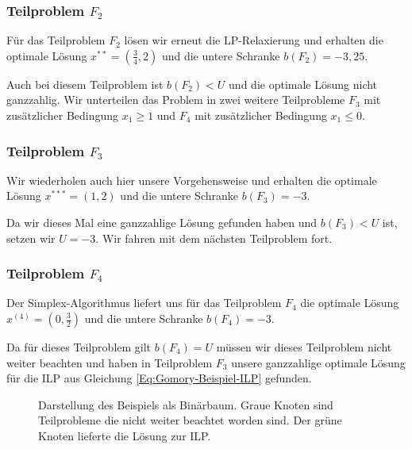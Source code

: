 \documentclass[tog]{acmsiggraph}
\begin{document}
\subsubsection*{Teilproblem $F_2$}

Für das Teilproblem $F_2$ lösen wir erneut die LP-Relaxierung und erhalten die optimale Lösung $x^{**} = (\frac{3}{4}, 2)$ und die untere Schranke $b(F_2) = -3,25$.

Auch bei diesem Teilproblem ist $b(F_2) < U$ und die optimale Lösung nicht ganzzahlig. Wir unterteilen das Problem in zwei weitere Teilprobleme $F_3$ mit zusätzlicher Bedingung $x_1 \geq 1$ und $F_4$ mit zusätzlicher Bedingung $x_1 \leq 0$.

\subsubsection*{Teilproblem $F_3$}

Wir wiederholen auch hier unsere Vorgehensweise und erhalten die optimale Lösung $x^{***} = (1, 2)$ und die untere Schranke $b(F_3) = -3$.

Da wir dieses Mal eine ganzzahlige Lösung gefunden haben und $b(F_3) < U$ ist, setzen wir $U = -3$. Wir fahren mit dem nächsten Teilproblem fort.

\subsubsection*{Teilproblem $F_4$}

Der Simplex-Algorithmus liefert uns für das Teilproblem $F_4$ die optimale Lösung $x^{(4)} = (0, \frac{3}{2})$ und die untere Schranke $b(F_4) = -3$.

Da für dieses Teilproblem gilt $b(F_4) = U$ müssen wir dieses Teilproblem nicht weiter beachten und haben in Teilproblem $F_3$ unsere ganzzahlige optimale Lösung für die ILP aus Gleichung \ref{Eq:Gomory-Beispiel-ILP} gefunden.

\begin{figure}[ht]
\centering
{}
\caption{Darstellung des Beispiels als Binärbaum. Graue Knoten sind Teilprobleme die nicht weiter beachtet worden sind. Der grüne Knoten lieferte die Lösung zur ILP.}
\label{fig:Branch-And-Bound-Bsp1}
\end{figure}
\end{document}
